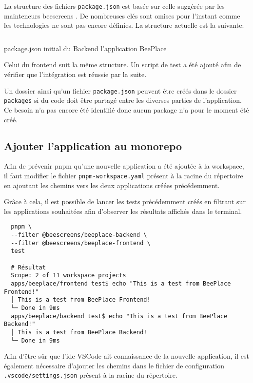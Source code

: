 La structure des fichiers \texttt{package.json} est basée sur celle suggérée par les mainteneurs \gls{beescreens} \cite{aboutpnpmbeescreens}. De nombreuses clés sont omises pour l'instant comme les technologies ne sont pas encore définies. La structure actuelle est la suivante:

\begin{listing}[h]
  \inputminted{json}{assets/figures/package.json}
  \caption{package.json initial du Backend l'application BeePlace}
\end{listing}

Celui du frontend suit la même structure. Un script de test a été ajouté afin de vérifier que l'intégration est réussie par la suite.

Un dossier ainsi qu'un fichier \texttt{package.json} peuvent être créés dans le dossier \texttt{packages} si du code doit être partagé entre les diverses parties de l'application. Ce besoin n'a pas encore été identifié donc aucun package n'a pour le moment été créé.

\subsection{Ajouter l'application au monorepo}

Afin de prévenir \gls{pnpm} qu'une nouvelle application a été ajoutée à la workspace, il faut modifier le fichier \texttt{pnpm-workspace.yaml} présent à la racine du répertoire en ajoutant les chemins vers les deux applications créées précédemment.


Grâce à cela, il est possible de lancer les tests précédemment créés en filtrant sur les applications souhaitées afin d'observer les résultats affichés dans le terminal.

\begin{verbatim}
  pnpm \
  --filter @beescreens/beeplace-backend \
  --filter @beescreens/beeplace-frontend \
  test

  # Résultat
  Scope: 2 of 11 workspace projects
  apps/beeplace/frontend test$ echo "This is a test from BeePlace Frontend!"
  │ This is a test from BeePlace Frontend!
  └─ Done in 9ms
  apps/beeplace/backend test$ echo "This is a test from BeePlace Backend!"
  │ This is a test from BeePlace Backend!
  └─ Done in 9ms
\end{verbatim}

Afin d'être sûr que l'\gls{ide} VSCode ait connaissance de la nouvelle application, il est également nécessaire d'ajouter les chemins dans le fichier de configuration \texttt{.vscode/settings.json} présent à la racine du répertoire.

